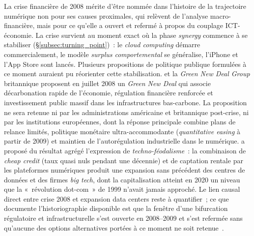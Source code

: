 %
La crise financière de 2008 mérite d'être nommée dans l'histoire de la trajectoire numérique non pour ses causes proximales, qui relèvent de l'analyse macro-financière, mais pour ce qu'elle a ouvert et refermé à propos du couplage ICT-économie. La crise survient au moment exact où la phase \emph{synergy} commence à se stabiliser (§\ref{subsec:turning_point})~: le \emph{cloud computing} démarre commercialement, le modèle \emph{surplus comportemental} se généralise, l'iPhone et l'App Store sont lancés. Plusieurs propositions de politique publique formulées à ce moment auraient pu réorienter cette stabilisation. \textcite{hines_green_2008} et la \emph{Green New Deal Group} britannique proposent en juillet 2008 un \emph{Green New Deal} qui associe décarbonation rapide de l'économie, régulation financière renforcée et investissement public massif dans les infrastructures bas-carbone. La proposition ne sera retenue ni par les administrations américaine et britannique post-crise, ni par les institutions européennes, dont la réponse principale combine plans de relance limités, politique monétaire ultra-accommodante (\emph{quantitative easing} à partir de 2009) et maintien de l'autorégulation industrielle dans le numérique. \textcite{varoufakis_techno_2023} a proposé du résultat agrégé l'expression de \emph{techno-féodalisme}~: la combinaison de \emph{cheap credit} (taux quasi nuls pendant une décennie) et de captation rentale par les plateformes numériques produit une expansion sans précédent des centres de données et des firmes \emph{big tech}, dont la capitalisation atteint en 2020 un niveau que la «~révolution dot-com~» de 1999 n'avait jamais approché. Le lien causal direct entre crise 2008 et expansion data centers reste à quantifier~; ce que documente l'historiographie disponible est que la fenêtre d'une bifurcation régulatoire et infrastructurelle s'est ouverte en 2008--2009 et s'est refermée sans qu'aucune des options alternatives portées à ce moment ne soit retenue~\parencite{lundvall_techno_2017}.

